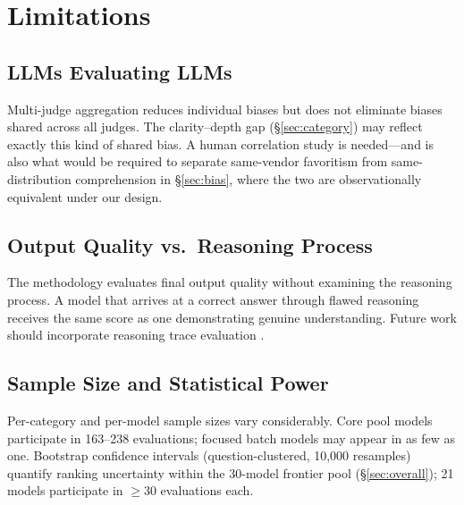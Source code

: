 \documentclass{article}
\begin{document}
\section{Limitations}

\subsection{LLMs Evaluating LLMs}
\label{sec:limitations_llm}

Multi-judge aggregation reduces individual biases but does not eliminate biases shared across all judges. The clarity--depth gap (\S\ref{sec:category}) may reflect exactly this kind of shared bias. A human correlation study is needed---and is also what would be required to separate same-vendor favoritism from same-distribution comprehension in \S\ref{sec:bias}, where the two are observationally equivalent under our design.

\subsection{Output Quality vs.\ Reasoning Process}

The methodology evaluates final output quality without examining the reasoning process. A model that arrives at a correct answer through flawed reasoning receives the same score as one demonstrating genuine understanding. Future work should incorporate reasoning trace evaluation \citep{turpin2023language}.

\subsection{Sample Size and Statistical Power}
\label{sec:power}

Per-category and per-model sample sizes vary considerably. Core pool models participate in 163--238 evaluations; focused batch models may appear in as few as one. Bootstrap confidence intervals (question-clustered, 10,000 resamples) quantify ranking uncertainty within the 30-model frontier pool (\S\ref{sec:overall}); 21 models participate in $\geq 30$ evaluations each.
\end{document}
